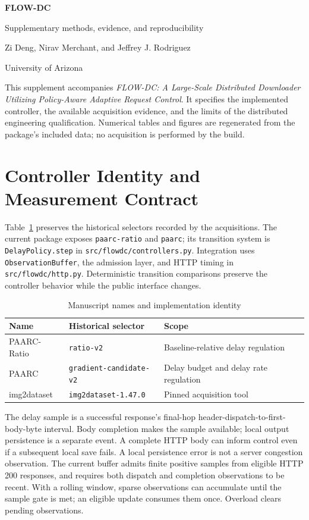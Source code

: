 \documentclass[10pt]{article}
\begin{document}
{\LARGE\bfseries\color{ink} FLOW-DC}\par
{\large Supplementary methods, evidence, and reproducibility}\par
Zi Deng, Nirav Merchant, and Jeffrey J. Rodriguez\par
University of Arizona\par\medskip
This supplement accompanies \emph{FLOW-DC: A Large-Scale Distributed Downloader Utilizing Policy-Aware Adaptive Request Control}. It specifies the implemented controller, the available acquisition evidence, and the limits of the distributed engineering qualification. Numerical tables and figures are regenerated from the package's included data; no acquisition is performed by the build.

\section{Controller Identity and Measurement Contract}
Table~\ref{tab:identity} preserves the historical selectors recorded by the acquisitions. The current package exposes \texttt{paarc-ratio} and \texttt{paarc}; its transition system is \texttt{DelayPolicy.step} in \nolinkurl{src/flowdc/controllers.py}. Integration uses \texttt{ObservationBuffer}, the admission layer, and HTTP timing in \nolinkurl{src/flowdc/http.py}. Deterministic transition comparisons preserve the controller behavior while the public interface changes.
\begin{table}[h]\centering\small
\caption{Manuscript names and implementation identity}\label{tab:identity}
\begin{tabular}{lll}\toprule
Name & Historical selector & Scope\\\midrule
PAARC-Ratio & \texttt{ratio-v2} & Baseline-relative delay regulation\\
PAARC & \texttt{gradient-candidate-v2} & Delay budget and delay rate regulation\\
img2dataset & \texttt{img2dataset-1.47.0} & Pinned acquisition tool\\\bottomrule
\end{tabular}\end{table}
The delay sample is a successful response's final-hop header-dispatch-to-first-body-byte interval. Body completion makes the sample available; local output persistence is a separate event. A complete HTTP body can inform control even if a subsequent local save fails. A local persistence error is not a server congestion observation. The current buffer admits finite positive samples from eligible HTTP 200 responses, and requires both dispatch and completion observations to be recent. With a rolling window, sparse observations can accumulate until the sample gate is met; an eligible update consumes them once. Overload clears pending observations.
\end{document}
